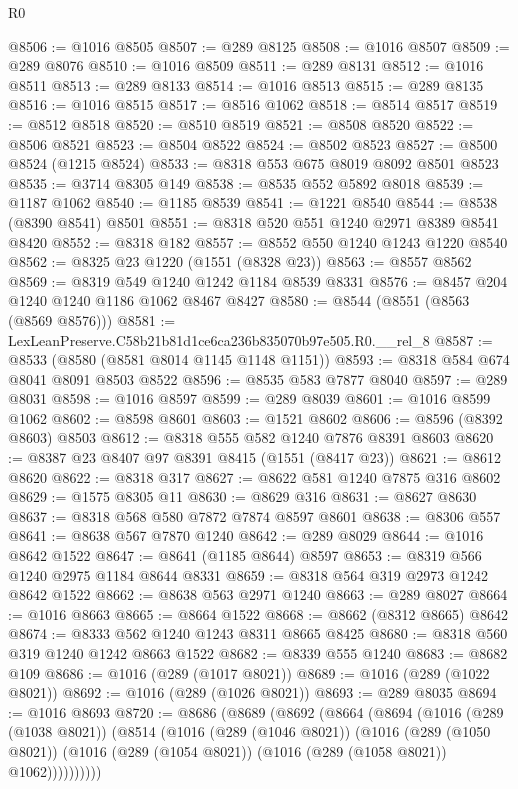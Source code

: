 \begin{lexlean}{R0}
\begin{coremodule}
@8506 := @1016 @8505
@8507 := @289 @8125
@8508 := @1016 @8507
@8509 := @289 @8076
@8510 := @1016 @8509
@8511 := @289 @8131
@8512 := @1016 @8511
@8513 := @289 @8133
@8514 := @1016 @8513
@8515 := @289 @8135
@8516 := @1016 @8515
@8517 := @8516 @1062
@8518 := @8514 @8517
@8519 := @8512 @8518
@8520 := @8510 @8519
@8521 := @8508 @8520
@8522 := @8506 @8521
@8523 := @8504 @8522
@8524 := @8502 @8523
@8527 := @8500 @8524 (@1215 @8524)
@8533 := @8318 @553 @675 @8019 @8092 @8501 @8523
@8535 := @3714 @8305 @149
@8538 := @8535 @552 @5892 @8018
@8539 := @1187 @1062
@8540 := @1185 @8539
@8541 := @1221 @8540
@8544 := @8538 (@8390 @8541) @8501
@8551 := @8318 @520 @551 @1240 @2971 @8389 @8541 @8420
@8552 := @8318 @182
@8557 := @8552 @550 @1240 @1243 @1220 @8540
@8562 := @8325 @23 @1220 (@1551 (@8328 @23))
@8563 := @8557 @8562
@8569 := @8319 @549 @1240 @1242 @1184 @8539 @8331
@8576 := @8457 @204 @1240 @1240 @1186 @1062 @8467 @8427
@8580 := @8544 (@8551 (@8563 (@8569 @8576)))
@8581 := LexLeanPreserve.C58b21b81d1ce6ca236b835070b97e505.R0.__rel_8
@8587 := @8533 (@8580 (@8581 @8014 @1145 @1148 @1151))
@8593 := @8318 @584 @674 @8041 @8091 @8503 @8522
@8596 := @8535 @583 @7877 @8040
@8597 := @289 @8031
@8598 := @1016 @8597
@8599 := @289 @8039
@8601 := @1016 @8599 @1062
@8602 := @8598 @8601
@8603 := @1521 @8602
@8606 := @8596 (@8392 @8603) @8503
@8612 := @8318 @555 @582 @1240 @7876 @8391 @8603
@8620 := @8387 @23 @8407 @97 @8391 @8415 (@1551 (@8417 @23))
@8621 := @8612 @8620
@8622 := @8318 @317
@8627 := @8622 @581 @1240 @7875 @316 @8602
@8629 := @1575 @8305 @11
@8630 := @8629 @316
@8631 := @8627 @8630
@8637 := @8318 @568 @580 @7872 @7874 @8597 @8601
@8638 := @8306 @557
@8641 := @8638 @567 @7870 @1240
@8642 := @289 @8029
@8644 := @1016 @8642 @1522
@8647 := @8641 (@1185 @8644) @8597
@8653 := @8319 @566 @1240 @2975 @1184 @8644 @8331
@8659 := @8318 @564 @319 @2973 @1242 @8642 @1522
@8662 := @8638 @563 @2971 @1240
@8663 := @289 @8027
@8664 := @1016 @8663
@8665 := @8664 @1522
@8668 := @8662 (@8312 @8665) @8642
@8674 := @8333 @562 @1240 @1243 @8311 @8665 @8425
@8680 := @8318 @560 @319 @1240 @1242 @8663 @1522
@8682 := @8339 @555 @1240
@8683 := @8682 @109
@8686 := @1016 (@289 (@1017 @8021))
@8689 := @1016 (@289 (@1022 @8021))
@8692 := @1016 (@289 (@1026 @8021))
@8693 := @289 @8035
@8694 := @1016 @8693
@8720 := @8686
    (@8689
      (@8692
        (@8664
          (@8694
            (@1016
              (@289 (@1038 @8021))
              (@8514
                (@1016
                  (@289 (@1046 @8021))
                  (@1016
                    (@289 (@1050 @8021))
                    (@1016 (@289 (@1054 @8021)) (@1016 (@289 (@1058 @8021)) @1062))))))))))

\end{coremodule}
\end{lexlean}
